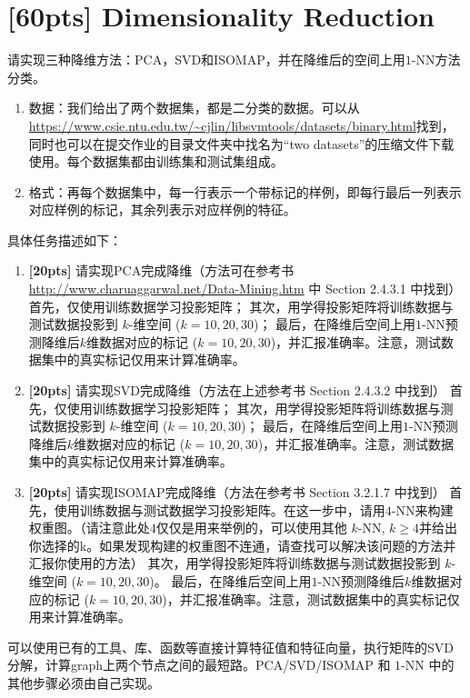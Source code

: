 \documentclass[a4paper,UTF8]{article}
\numberwithin{equation}{section}
\begin{document}
	\section{[60pts] Dimensionality Reduction}
	请实现三种降维方法：PCA，SVD和ISOMAP，并在降维后的空间上用$1$-NN方法分类。
	\begin{enumerate}
		\item 数据：我们给出了两个数据集，都是二分类的数据。可以从\url{https://www.csie.ntu.edu.tw/~cjlin/libsvmtools/datasets/binary.html}找到，同时也可以在提交作业的目录文件夹中找名为“two datasets”的压缩文件下载使用。每个数据集都由训练集和测试集组成。
		\item 格式：再每个数据集中，每一行表示一个带标记的样例，即每行最后一列表示对应样例的标记，其余列表示对应样例的特征。
	\end{enumerate}
	
	具体任务描述如下：
	\begin{enumerate}
		\item \textbf{[20pts]} 请实现PCA完成降维（方法可在参考书\url{http://www.charuaggarwal.net/Data-Mining.htm} 中 Section 2.4.3.1 中找到）
		\subitem 首先，仅使用训练数据学习投影矩阵；
		\subitem 其次，用学得投影矩阵将训练数据与测试数据投影到 $k$-维空间 ($k=10,20,30$)；
		\subitem 最后，在降维后空间上用$1$-NN预测降维后$k$维数据对应的标记 ($k=10,20,30$)，并汇报准确率。注意，测试数据集中的真实标记仅用来计算准确率。
		\item \textbf{[20pts]} 请实现SVD完成降维（方法在上述参考书 Section 2.4.3.2 中找到）
		\subitem 首先，仅使用训练数据学习投影矩阵；
		\subitem 其次，用学得投影矩阵将训练数据与测试数据投影到 $k$-维空间 ($k=10,20,30$)；
		\subitem 最后，在降维后空间上用$1$-NN预测降维后$k$维数据对应的标记 ($k=10,20,30$)，并汇报准确率。注意，测试数据集中的真实标记仅用来计算准确率。
		\item \textbf{[20pts]} 请实现ISOMAP完成降维（方法在参考书 Section 3.2.1.7 中找到）
		\subitem 首先，使用训练数据与测试数据学习投影矩阵。在这一步中，请用$4$-NN来构建权重图。（请注意此处$4$仅仅是用来举例的，可以使用其他 $k$-NN, $k\geq 4$并给出你选择的k。如果发现构建的权重图不连通，请查找可以解决该问题的方法并汇报你使用的方法）
		\subitem 其次，用学得投影矩阵将训练数据与测试数据投影到 $k$-维空间 ($k=10,20,30$)。
		\subitem 最后，在降维后空间上用$1$-NN预测降维后$k$维数据对应的标记 ($k=10,20,30$)，并汇报准确率。注意，测试数据集中的真实标记仅用来计算准确率。
	\end{enumerate}
	
	可以使用已有的工具、库、函数等直接计算特征值和特征向量，执行矩阵的SVD分解，计算graph上两个节点之间的最短路。PCA/SVD/ISOMAP 和 $1$-NN 中的其他步骤必须由自己实现。
	
\end{document}
